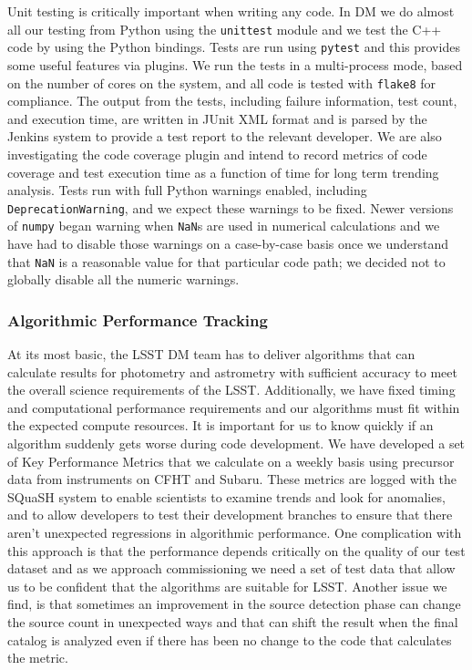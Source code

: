 Unit testing is critically important when writing any code.
In DM we do almost all our testing from Python using the \texttt{unittest} module and we test the C++ code by using the Python bindings.
Tests are run using \texttt{pytest}\cite{pytest} and this provides some useful features via plugins.
We run the tests in a multi-process mode, based on the number of cores on the system, and all code is tested with \texttt{flake8} for compliance.
The output from the tests, including failure information, test count, and execution time, are written in JUnit XML format and is parsed by the Jenkins system to provide a test report to the relevant developer.
We are also investigating the code coverage plugin and intend to record metrics of code coverage and test execution time as a function of time for long term trending analysis.
Tests run with full Python warnings enabled, including \texttt{DeprecationWarning}, and we expect these warnings to be fixed.
Newer versions of \texttt{numpy} began warning when \texttt{NaN}s are used in numerical calculations and we have had to disable those warnings on a case-by-case basis once we understand that \texttt{NaN} is a reasonable value for that particular code path; we decided not to globally disable all the numeric warnings.

\subsubsection{Algorithmic Performance Tracking}

At its most basic, the LSST DM team has to deliver algorithms that can calculate results for photometry and astrometry with sufficient accuracy to meet the overall science requirements of the LSST\cite{LPM-17}.
Additionally, we have fixed timing and computational performance requirements and our algorithms must fit within the expected compute resources.
It is important for us to know quickly if an algorithm suddenly gets worse during code development.
We have developed a set of Key Performance Metrics that we calculate on a weekly basis using precursor data from instruments on CFHT and Subaru.
These metrics are logged with the SQuaSH system\cite{SQR-009} to enable scientists to examine trends and look for anomalies, and to allow developers to test their development branches to ensure that there aren't unexpected regressions in algorithmic performance.
One complication with this approach is that the performance depends critically on the quality of our test dataset and as we approach commissioning we need a set of test data that allow us to be confident that the algorithms are suitable for LSST.
Another issue we find, is that sometimes an improvement in the source detection phase can change the source count in unexpected ways and that can shift the result when the final catalog is analyzed even if there has been no change to the code that calculates the metric.
